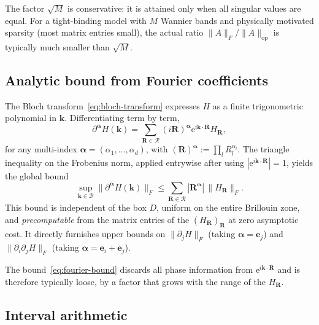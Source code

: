 \documentclass[11pt]{article}
\numberwithin{equation}{section}
\begin{document}
\begin{remark}
    The factor \(\sqrt{M}\) is conservative: it is attained only when all
    singular values are equal. For a tight-binding model with \(M\) Wannier
    bands and physically motivated sparsity (most matrix entries small), the
    actual ratio \(\|A\|_F / \|A\|_\mathrm{op}\) is typically much smaller than
    \(\sqrt{M}\).
\end{remark}
\subsection{Analytic bound from Fourier coefficients}\label{sec:bounds-analytic-fourier}

The Bloch transform~\eqref{eq:bloch-transform} expresses \(H\) as a finite
trigonometric polynomial in \(\mathbf{k}\). Differentiating term by term,
\begin{equation}
    \partial^{\bm\alpha} H(\mathbf{k})
    = \sum_{\mathbf{R} \in \mathcal{R}}
    (i\mathbf{R})^{\bm\alpha} \mathrm{e}^{i\mathbf{k}\cdot\mathbf{R}}
    H_\mathbf{R},
\end{equation}
for any multi-index \(\bm\alpha = (\alpha_1, \dots, \alpha_d)\), with
\((\mathbf{R})^{\bm\alpha} := \prod_l R_l^{\alpha_l}\). The triangle inequality
on the Frobenius norm, applied entrywise after using \(|\mathrm{e}^{i\mathbf{k}
    \cdot \mathbf{R}}| = 1\), yields the global bound
\begin{equation}
    \sup_{\mathbf{k} \in \mathcal{B}} \|\partial^{\bm\alpha} H(\mathbf{k})\|_F
    \leq \sum_{\mathbf{R} \in \mathcal{R}}
    |\mathbf{R}^{\bm\alpha}|\, \|H_\mathbf{R}\|_F.
    \label{eq:fourier-bound}
\end{equation}
This bound is independent of the box \(D\), uniform on the entire Brillouin
zone, and \emph{precomputable} from the matrix entries of the
\((H_\mathbf{R})_\mathbf{R}\) at zero asymptotic cost. It directly furnishes
upper bounds on \(\|\partial_j H\|_F\) (taking \(\bm\alpha = \mathbf{e}_j\)) and
\(\|\partial_i \partial_j H\|_F\) (taking \(\bm\alpha = \mathbf{e}_i +
\mathbf{e}_j\)).

\begin{remark}
    The bound~\eqref{eq:fourier-bound} discards all phase information from
    \(\mathrm{e}^{i\mathbf{k}\cdot\mathbf{R}}\) and is therefore typically loose,
    by a factor that grows with the range of the \(H_\mathbf{R}\).
\end{remark}
\subsection{Interval arithmetic}\label{sec:interval-arithmetic}
\end{document}
